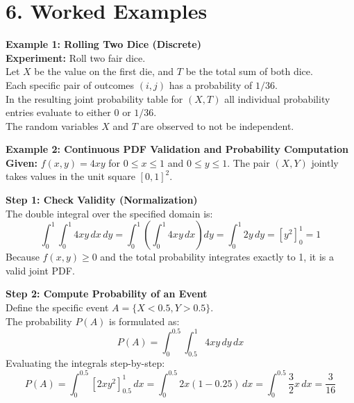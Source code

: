 \documentclass[12pt]{article}
\begin{document}
\section{6. Worked Examples}
\textbf{Example 1: Rolling Two Dice (Discrete)} \\
\textbf{Experiment:} Roll two fair dice. \\
Let $X$ be the value on the first die, and $T$ be the total sum of both dice. \\
Each specific pair of outcomes $(i, j)$ has a probability of $1/36$. \\
In the resulting joint probability table for $(X, T)$ all individual probability entries evaluate to either 0 or $1/36$. \\
The random variables $X$ and $T$ are observed to not be independent.

\vspace{0.5cm}
\noindent
\textbf{Example 2: Continuous PDF Validation and Probability Computation} \\
\textbf{Given:} $f(x, y) = 4xy$ for $0 \le x \le 1$ and $0 \le y \le 1$. The pair $(X, Y)$ jointly takes values in the unit square $[0, 1]^2$.

\noindent
\textbf{Step 1: Check Validity (Normalization)} \\
The double integral over the specified domain is:
\[ \int_{0}^{1} \int_{0}^{1} 4xy \, dx \, dy = \int_{0}^{1} \left( \int_{0}^{1} 4xy \, dx \right) dy = \int_{0}^{1} 2y \, dy = [y^2]_0^1 = 1 \]
Because $f(x, y) \ge 0$ and the total probability integrates exactly to 1, it is a valid joint PDF.

\noindent
\textbf{Step 2: Compute Probability of an Event} \\
Define the specific event $A = \{X < 0.5, Y > 0.5\}$. \\
The probability $P(A)$ is formulated as:
\[ P(A) = \int_{0}^{0.5} \int_{0.5}^{1} 4xy \, dy \, dx \]
Evaluating the integrals step-by-step:
\[ P(A) = \int_{0}^{0.5} [2xy^2]_{0.5}^{1} \, dx = \int_{0}^{0.5} 2x(1 - 0.25) \, dx = \int_{0}^{0.5} \frac{3}{2}x \, dx = \frac{3}{16} \]
\end{document}
